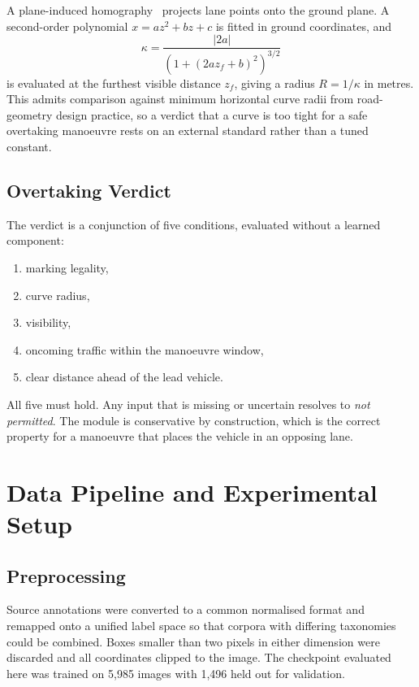 \documentclass[11pt,a4paper]{report}
\begin{document}
A plane-induced homography~\cite{hartley2004multiple} projects lane points onto
the ground plane. A second-order polynomial $x = az^2 + bz + c$ is fitted in
ground coordinates, and
\begin{equation}
  \kappa = \frac{|2a|}{\left(1 + (2az_f + b)^2\right)^{3/2}}
\end{equation}
is evaluated at the furthest visible distance $z_f$, giving a radius
$R = 1/\kappa$ in metres. This admits comparison against minimum horizontal
curve radii from road-geometry design practice, so a verdict that a curve is too
tight for a safe overtaking manoeuvre rests on an external standard rather than
a tuned constant.

\section{Overtaking Verdict}

The verdict is a conjunction of five conditions, evaluated without a learned
component:

\begin{enumerate}[leftmargin=1.6em,itemsep=1pt]
  \item marking legality,
  \item curve radius,
  \item visibility,
  \item oncoming traffic within the manoeuvre window,
  \item clear distance ahead of the lead vehicle.
\end{enumerate}

All five must hold. Any input that is missing or uncertain resolves to
\textit{not permitted}. The module is conservative by construction, which is the
correct property for a manoeuvre that places the vehicle in an opposing lane.

\chapter{Data Pipeline and Experimental Setup}

\section{Preprocessing}

Source annotations were converted to a common normalised format and remapped
onto a unified label space so that corpora with differing taxonomies could be
combined. Boxes smaller than two pixels in either dimension were discarded and
all coordinates clipped to the image. The checkpoint evaluated here was trained
on 5{,}985 images with 1{,}496 held out for validation.
\end{document}
